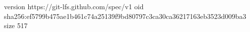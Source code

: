 version https://git-lfs.github.com/spec/v1
oid sha256:ef5799b475ae1b461c74a25139f9bd80797c3ca30ca36217163eb3523d009ba3
size 517
